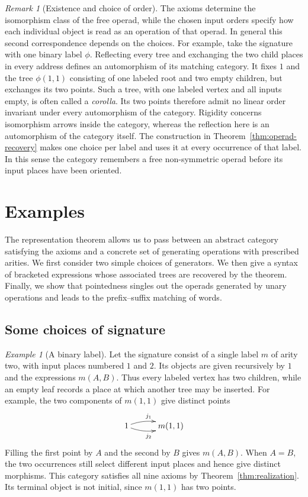 \documentclass[11pt,a4paper]{article}
\theoremstyle{plain}
\theoremstyle{definition}
\theoremstyle{remark}
\newtheorem{remark}[theorem]{Remark}
\newtheorem{example}[theorem]{Example}
\newcommand{\one}{1}
\begin{document}
\begin{remark}[Existence and choice of order]\label{rem:order-choice}
The axioms determine the isomorphism class of the free operad, while
the chosen input orders specify how each individual object is read
as an operation of that operad. In general this second correspondence
depends on the choices.
For example, take the signature with one binary label $\phi$.
Reflecting every tree and exchanging the two child places in every
address defines an automorphism of its matching category. It fixes
$\one$ and the tree $\phi(\one,\one)$ consisting of one
labeled root and two empty children, but exchanges its two points.
Such a tree, with one labeled vertex and all inputs empty, is
often called a \emph{corolla}. Its two points therefore admit no
linear order invariant under every automorphism of the category.
Rigidity concerns isomorphism arrows inside the category, whereas
the reflection here is an automorphism of the category itself.
The construction in Theorem~\ref{thm:operad-recovery} makes one
choice per label and uses it at every occurrence of that label.
In this sense the category remembers a free non-symmetric operad
before its input places have been oriented.
\end{remark}


\section{Examples}\label{sec:examples}
The representation theorem allows us to pass between an abstract
category satisfying the axioms and a concrete set of generating
operations with prescribed arities. We first consider two simple
choices of generators. We then give a syntax of bracketed expressions
whose associated trees are recovered by the theorem. Finally, we
show that pointedness singles out the operads generated by unary
operations and leads to the prefix--suffix matching of words.

\subsection{Some choices of signature}\label{sec:signature-examples}
\begin{example}[A binary label]
Let the signature consist of a single label $m$ of arity two, with
input places numbered $1$ and $2$. Its objects are given recursively by
$1$ and the expressions $m(A,B)$. Thus every labeled vertex has two
children, while an empty leaf records a place at which another tree
may be inserted. For example, the two components of $m(1,1)$ give
distinct points
\[
\xymatrix@C=3em{
1\ar@/^/[r]^{j_1}\ar@/_/[r]_{j_2}&m(1,1)
}
\]
Filling the first point by $A$ and the second by $B$ gives $m(A,B)$.
When $A=B$, the two occurrences still select different input places
and hence give distinct morphisms. This category satisfies all nine axioms by
Theorem~\ref{thm:realization}. Its terminal object is not initial,
since $m(1,1)$ has two points.
\end{example}
\end{document}
